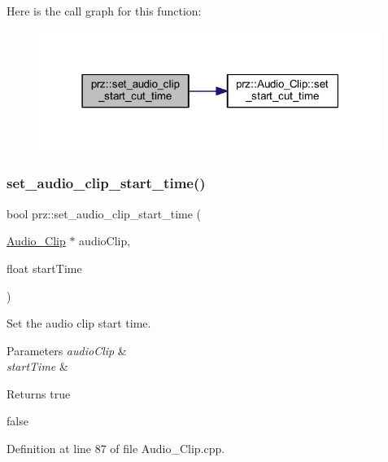 Here is the call graph for this function\+:
\nopagebreak
\begin{figure}[H]
\begin{center}
\leavevmode
\includegraphics[width=316pt]{namespaceprz_a8ed2ed05812cc89ec640c5fe96182e94_cgraph}
\end{center}
\end{figure}
\mbox{\label{namespaceprz_ac8b09f14a5b58fe5ca2521460856443d}} 
\subsubsection{\texorpdfstring{set\_audio\_clip\_start\_time()}{set\_audio\_clip\_start\_time()}}
{\footnotesize\ttfamily bool prz\+::set\+\_\+audio\+\_\+clip\+\_\+start\+\_\+time (\begin{DoxyParamCaption}\item[{\mbox{\hyperlink{classprz_1_1_audio___clip}{Audio\+\_\+\+Clip}} $\ast$}]{audio\+Clip,  }\item[{float}]{start\+Time }\end{DoxyParamCaption})}



Set the audio clip start time. 


\begin{DoxyParams}{Parameters}
{\em audio\+Clip} & \\
\hline
{\em start\+Time} & \\
\hline
\end{DoxyParams}
\begin{DoxyReturn}{Returns}
true 

false 
\end{DoxyReturn}


Definition at line 87 of file Audio\+\_\+\+Clip.\+cpp.

